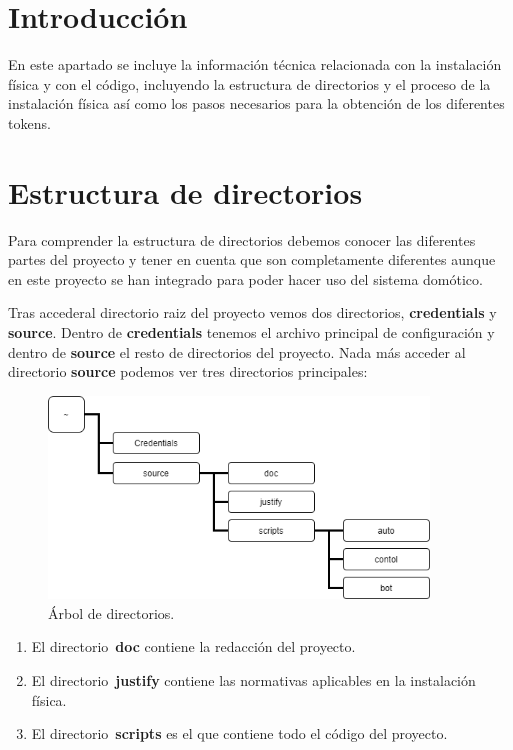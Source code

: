 
\section{Introducción}
En este apartado se incluye la información técnica relacionada con la instalación física y con el código, incluyendo la estructura de directorios y el proceso de la instalación física así como los pasos necesarios para la obtención de los diferentes tokens.

\section{Estructura de directorios}
Para comprender la estructura de directorios debemos conocer las diferentes partes del proyecto y tener en cuenta que son completamente diferentes aunque en este proyecto se han integrado para poder hacer uso del sistema domótico. 

Tras accederal directorio raiz del proyecto vemos dos directorios, \textbf{credentials} y \textbf{source}. Dentro de \textbf{credentials} tenemos el archivo principal de configuración y dentro de \textbf{source} el resto de directorios del proyecto. Nada más acceder al directorio \textbf{source} podemos ver tres directorios principales:

\begin{figure}[h]
\centering
\includegraphics[width=0.9\textwidth]{img/Diagramas/directorios1.png}
\caption{Árbol de directorios.}\label{Directorios}
\end{figure}

\begin{enumerate}
    \item El directorio~\textbf{doc} contiene la redacción del proyecto.
    \item El directorio~\textbf{justify} contiene las normativas aplicables en la instalación física.
    \item El directorio~\textbf{scripts} es el que contiene todo el código del proyecto.
\end{enumerate}

